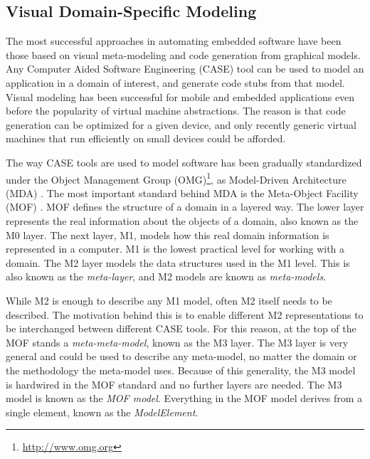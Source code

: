 \subsection{Visual Domain-Specific Modeling}
\label{c2.vm}

The most successful approaches in automating embedded software have been those based on visual meta-modeling and code generation from graphical models. Any Computer Aided Software Engineering (CASE) tool can be used to model an application in a domain of interest, and generate code stubs from that model. Visual modeling has been successful for mobile and embedded applications even before the popularity of virtual machine abstractions. The reason is that code generation can be optimized for a given device, and only recently generic virtual machines that run efficiently on small devices could be afforded.

The way CASE tools are used to model software has been gradually standardized under the Object Management Group (OMG)\footnote{\url{http://www.omg.org}}, as Model-Driven Architecture (MDA) \cite{mda.frankel}. The most important standard behind MDA is the Meta-Object Facility (MOF) \cite{www.mof}. MOF defines the structure of a domain in a layered way. The lower layer represents the real information about the objects of a domain, also known as the M0 layer. The next layer, M1, models how this real domain information is represented in a computer. M1 is the lowest practical level for working with a domain. The M2 layer models the data structures used in the M1 level. This is also known as the \textit{meta-layer}, and M2 models are known as \textit{meta-models}.

While M2 is enough to describe any M1 model, often M2 itself needs to be described. The motivation behind this is to enable different M2 representations to be interchanged between different CASE tools. For this reason, at the top of the MOF stands a \textit{meta-meta-model}, known as the M3 layer. The M3 layer is very general and could be used to describe any meta-model, no matter the domain or the methodology the meta-model uses. Because of this generality, the M3 model is hardwired in the MOF standard and no further layers are needed. The M3 model is known as the \textit{MOF model}. Everything in the MOF model derives from a single element, known as the \textit{ModelElement}.

